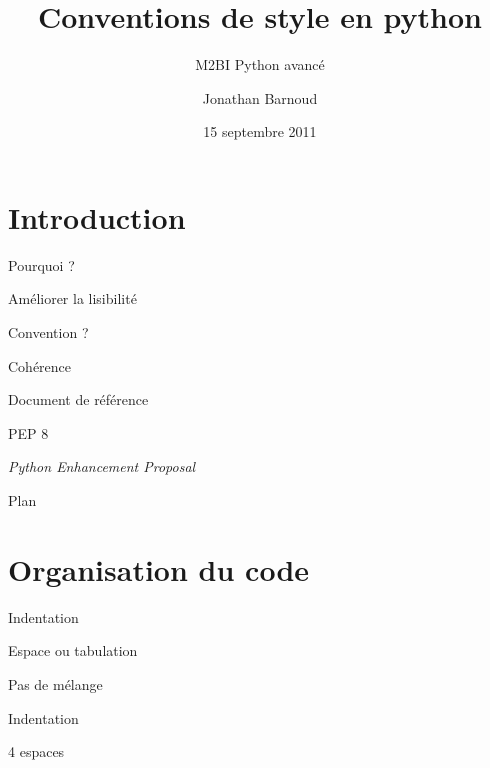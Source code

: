 \documentclass[xcolor=pdftex,dvipsnames,table,handout]{beamer}
\title{Conventions de style en python}
\subtitle{M2BI Python avancé}
\author{Jonathan Barnoud}
\date{15 septembre 2011}
\begin{document}
\titleframe{}

\section{Introduction}

\begin{frame}{Pourquoi ?}
\begin{center}
\Huge{Améliorer la lisibilité}
\end{center}
\end{frame}

\begin{frame}{Convention ?}
\begin{center}
\Huge{Cohérence}
\vspace{1cm}

\Large{}
\end{center}
\end{frame}

\begin{frame}{Document de référence}
\begin{center}
\Huge{PEP 8}
\vspace{1cm}

\Large{\textit{Python Enhancement Proposal}}
\end{center}
\end{frame}


\begin{frame}{Plan}
\tableofcontents
\end{frame}

\section{Organisation du code}

\begin{frame}{Indentation}
\begin{center}
\Large{Espace ou tabulation}
\vspace{2cm}

\Large{Pas de mélange}
\end{center}
\end{frame}

\begin{frame}{Indentation}
\begin{center}
\Huge{4 espaces}
\end{center}
\end{frame}
\end{document}

